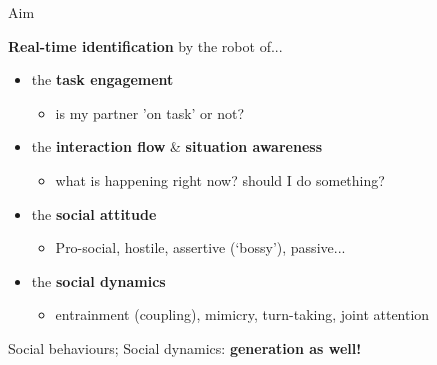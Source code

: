 \documentclass[compress]{beamer}
\begin{document}




\begin{frame}{Aim}

    {\bf Real-time identification} by the robot of...

    \begin{itemize}
        \item<+-> the \textbf{task engagement}
            \begin{itemize}
                \item is my partner 'on task' or not?
            \end{itemize}
        \item<+-> the \textbf{interaction flow} \& \textbf{situation awareness}
            \begin{itemize}
                \item what is happening right now? should I do something?
            \end{itemize}
        \item<+-> the \textbf{social attitude}
            \begin{itemize}
                \item Pro-social, hostile, assertive (‘bossy’), passive...
            \end{itemize}
        \item<+-> the \textbf{social dynamics}
            \begin{itemize}
                \item entrainment (coupling), mimicry, turn-taking, joint
                    attention
            \end{itemize}
    \end{itemize}

    \pause

    Social behaviours; Social dynamics: \textbf{generation as well!}
\end{frame}




%
%
%
%
\end{document}
